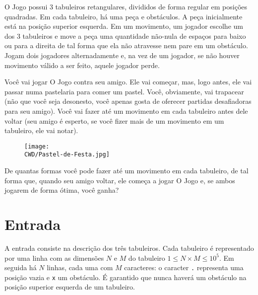 %

O Jogo possui 3 tabuleiros retangulares, divididos de forma regular em posições quadradas. Em cada tabuleiro, há uma peça e obstáculos. A peça inicialmente está na posição superior esquerda. Em um movimento, um jogador escolhe um dos 3 tabuleiros e move a peça uma quantidade não-nula de espaços para baixo ou para a direita de tal forma que ela não atravesse nem pare em um obstáculo. Jogam dois jogadores alternadamente e, na vez de um jogador, se não houver movimento válido a ser feito, aquele jogador perde.

Você vai jogar O Jogo contra seu amigo. Ele vai começar, mas, logo antes, ele vai passar numa pastelaria para comer um pastel. Você, obviamente, vai trapacear (não que você seja desonesto, você apenas gosta de oferecer partidas desafiadoras para seu amigo). Você vai fazer até um movimento em cada tabuleiro antes dele voltar (seu amigo é esperto, se você fizer mais de um movimento em um tabuleiro, ele vai notar).

\begin{figure}[H]
    \centering
    \texttt{[image: \\CWD/Pastel-de-Festa.jpg]}
  \end{figure}

De quantas formas você pode fazer até um movimento em cada tabuleiro, de tal forma que, quando seu amigo voltar, ele começa a jogar O Jogo e, se ambos jogarem de forma ótima, você ganha?

%
%

\section*{Entrada}

A entrada consiste na descrição dos três tabuleiros. Cada tabuleiro é representado por uma linha com as dimensões $N$ e $M$ do tabuleiro $1 \leq N\times M \leq 10^5$. Em seguida há $N$ linhas, cada uma com $M$ caracteres: o caracter {\tt .} representa uma posição vazia e {\tt x} um obstáculo. É garantido que nunca haverá um obstáculo na posição superior esquerda de um tabuleiro.

%
%

